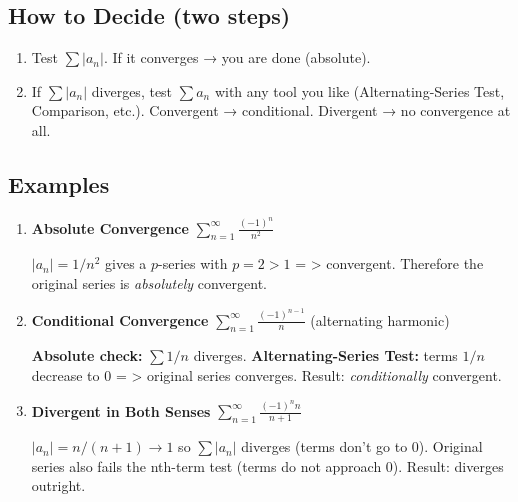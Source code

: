 \documentclass{article}
\begin{document}
\subsection*{How to Decide (two steps)}
\begin{enumerate}[itemsep=2pt]
  \item Test \(\displaystyle\sum |a_n|\).  
        If it converges → you are done (absolute).
  \item If \(\sum |a_n|\) diverges, test \(\sum a_n\) with any tool you like  
        (Alternating-Series Test, Comparison, etc.).  
        Convergent → conditional. Divergent → no convergence at all.
\end{enumerate}

\subsection*{Examples}

\begin{enumerate}[label=\textbf{\arabic*.},itemsep=12pt]

  \item \textbf{Absolute Convergence}  
        \(\displaystyle\sum_{n=1}^{\infty} \frac{(-1)^{n}}{n^{2}}\)

        \(|a_n| = 1/n^{2}\) gives a \(p\)-series with \(p=2>1\)  = > convergent.  
        Therefore the original series is \emph{absolutely} convergent.

  \item \textbf{Conditional Convergence}  
        \(\displaystyle\sum_{n=1}^{\infty}\frac{(-1)^{n-1}}{n}\) (alternating harmonic)

        \textbf{Absolute check:} \(\sum 1/n\) diverges.  
        \textbf{Alternating-Series Test:} terms \(1/n\) decrease to 0 = > original series converges.  
        Result: \emph{conditionally} convergent.

  \item \textbf{Divergent in Both Senses}  
        \(\displaystyle\sum_{n=1}^{\infty} \frac{(-1)^{n} n}{n+1}\)

        \(|a_n| = n/(n+1) \to 1\) so \(\sum |a_n|\) diverges (terms don’t go to 0).  
        Original series also fails the nth-term test (terms do not approach 0).  
        Result: diverges outright.

\end{enumerate}
\end{document}
